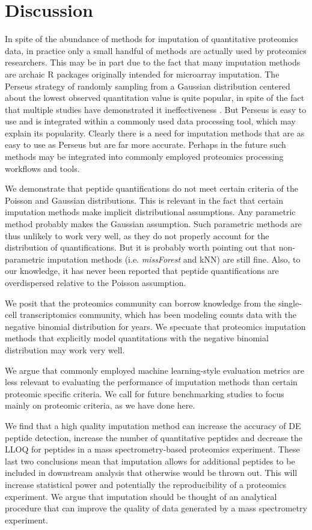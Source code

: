 \documentclass{article}
\begin{document}
\section{Discussion}
In spite of the abundance of methods for imputation of quantitative proteomics data, in practice only a small handful of methods are actually used by proteomics researchers. This may be in part due to the fact that many imputation methods are archaic R packages originally intended for microarray imputation. The Perseus strategy of randomly sampling from a Gaussian distribution centered about the lowest observed quantitation value is quite popular, in spite of the fact that multiple studies have demonstrated it ineffectiveness \cite{lazar, Bramer:review, Webb-Robertson:review}. But Perseus is easy to use and is integrated within a commonly used data processing tool, which may explain its popularity. Clearly there is a need for imputation methods that are as easy to use as Perseus but are far more accurate. Perhaps in the future such methods may be integrated into commonly employed proteomics processing workflows and tools. 

We demonstrate that peptide quantifications do not meet certain criteria of the Poisson and Gaussian distributions. This is relevant in the fact that certain imputation methods make implicit distributional assumptions. Any parametric method probably makes the Gaussian assumption. Such parametric methods are thus unlikely to work very well, as they do not properly account for the distribution of quantifications. But it is probably worth pointing out that non-parametric imputation methods (i.e. \textit{missForest} and kNN) are still fine. Also, to our knowledge, it has never been reported that peptide quantifications are overdispersed relative to the Poisson assumption. 

We posit that the proteomics community can borrow knowledge from the single-cell transcriptomics community, which has been modeling counts data with the negative binomial distribution for years.  We specuate that proteomics imputation methods that explicitly model quantitations with the negative binomial distribution may work very well. 

We argue that commonly employed machine learning-style evaluation metrics are less relevant to evaluating the performance of imputation methods than certain proteomic specific criteria. We call for future benchmarking studies to focus mainly on proteomic criteria, as we have done here. 

We find that a high quality imputation method can increase the accuracy of DE peptide detection, increase the number of quantitative peptides and decrease the LLOQ for peptides in a mass spectrometry-based proteomics experiment. These last two conclusions mean that imputation allows for additional peptides to be included in downstream analysis that otherwise would be thrown out. This will increase statistical power and potentially the reproducibility of a proteomics experiment. We argue that imputation should be thought of an analytical procedure that can improve the quality of data generated by a mass spectrometry experiment. 
\end{document}
